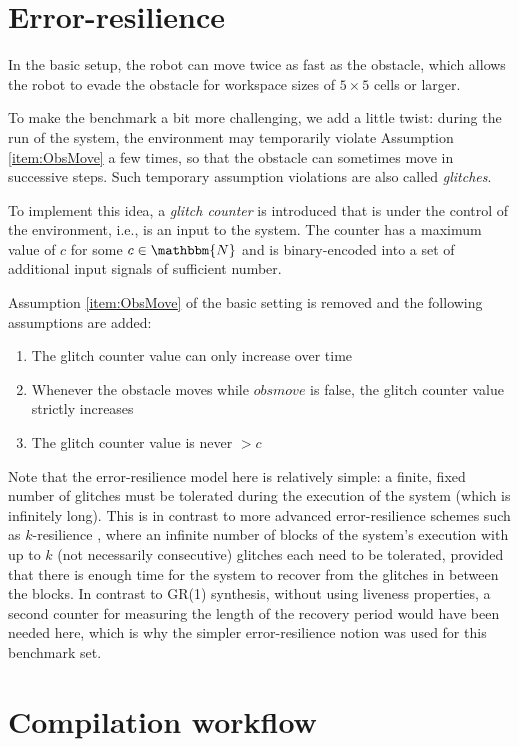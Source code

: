\documentclass[a4paper,conference,10pt]{IEEEtran}
\newcommand{\NN}{\mathbbm{N}}
\begin{document}
\section{Error-resilience}

\noindent In the basic setup, the robot can move twice as fast as the obstacle, which allows the robot to evade the obstacle for workspace sizes of $5 \times 5$ cells or larger.

To make the benchmark a bit more challenging, we add a little twist: during the run of the system, the environment may temporarily violate Assumption \ref{item:ObsMove} a few times, so that the obstacle can sometimes move in successive steps. Such temporary assumption violations are also called \emph{glitches}.

To implement this idea, a \emph{glitch counter} is introduced that is under the control of the environment, i.e., is an input to the system. The counter has a maximum value of $c$ for some $c \in \NN$ and is binary-encoded into a set of additional input signals of sufficient number. 

Assumption \ref{item:ObsMove} of the basic setting is removed and the following assumptions are added:
\begin{enumerate}
\item The glitch counter value can only increase over time
\item Whenever the obstacle moves while $\mathit{obsmove}$ is false, the glitch counter value strictly increases
\item The glitch counter value is never $> c$
\end{enumerate}

Note that the error-resilience model here is relatively simple: a finite, fixed number of glitches must be tolerated during the execution of the system (which is infinitely long). 
This is in contrast to more advanced error-resilience schemes such as $k$-resilience \cite{DBLP:journals/corr/abs-1210-2449,EhlersTopcuHSCC2014}, where an infinite number of blocks of the system's execution with up to $k$ (not necessarily consecutive) glitches each need to be tolerated, provided that there is enough time for the system to recover from the glitches in between the blocks. In contrast to GR(1) synthesis, without using liveness properties, a second counter for measuring the length of the recovery period would have been needed here, which is why the simpler error-resilience notion was used for this benchmark set.

\section{Compilation workflow}
\end{document}
